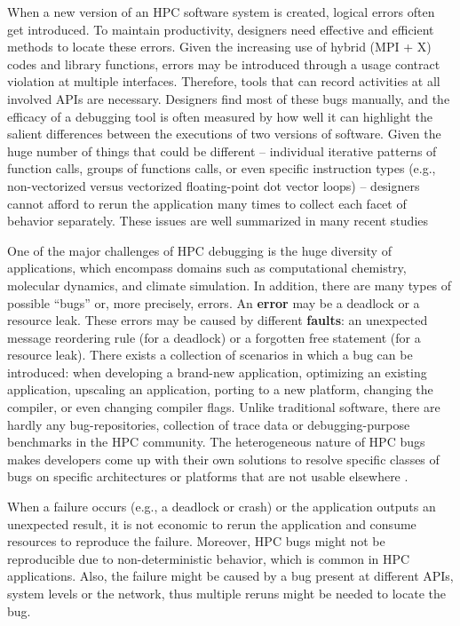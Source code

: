 ﻿When a new version of an HPC software system is created, logical errors often get introduced.
%
To maintain productivity, designers need effective and efficient methods to locate these errors.
%
Given the increasing use of hybrid (MPI + X) codes and library functions, errors may be introduced through a usage contract violation at multiple interfaces.
%
Therefore, tools that can record activities at all involved APIs are necessary.
%
Designers find most of these bugs manually, and the efficacy of a debugging tool is
often measured by how well it can highlight the salient differences between the
executions of two versions of software.
%
Given the huge number of things that could be different -- individual iterative
patterns of function calls, groups of functions calls, or even specific instruction
types (e.g., non-vectorized versus vectorized floating-point dot vector loops) -- designers
cannot afford to rerun the application many times to collect each facet
of behavior separately.
%
These issues are well summarized in many recent studies \cite{hpcdoe}


One of the major challenges of HPC debugging is the huge diversity of applications, which encompass domains such as computational chemistry, molecular dynamics, and climate simulation.
%
In addition, there are many types of possible “bugs” or, more precisely, errors. An \textbf{error} may be a deadlock or a resource leak. These errors may be caused by different \textbf{faults}: an unexpected message reordering rule (for a deadlock) or a forgotten free statement (for a resource leak).
%
There exists a collection of scenarios in which a bug can be introduced: when developing a brand-new application, optimizing an existing application, upscaling an application, porting to a new platform, changing the compiler, or even changing compiler flags.
%
Unlike traditional software, there are hardly any bug-repositories, collection of trace data or debugging-purpose benchmarks in the HPC community.
%
The heterogeneous nature of HPC bugs makes developers come up with their own solutions to resolve specific classes of bugs on specific architectures or platforms that are not usable elsewhere \cite{hpcdoe}.

When a failure occurs (e.g., a deadlock or crash) or the application outputs an unexpected result, it is not economic to rerun the application and consume resources to reproduce the failure. Moreover, HPC bugs might not be reproducible due to non-deterministic behavior, which is common in HPC applications. Also, the failure might be caused by a bug present at different APIs, system levels or the network, thus multiple reruns might be needed to locate the bug.

